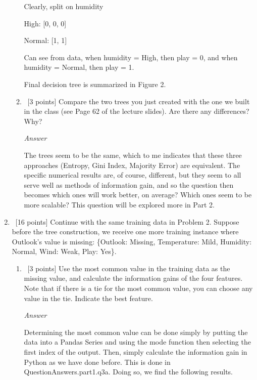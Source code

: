 \documentclass[12pt, fullpage,letterpaper]{article}
\begin{document}
\begin{enumerate}
\begin{enumerate}
    \vspace{5mm}
    
    Clearly, split on humidity
    
    \vspace{5mm}
    
    High: [0, 0, 0]
    
    Normal: [1, 1]

    \vspace{5mm}
    
    Can see from data, when humidity = High, then play = 0, and when humidity = Normal, then play = 1.
    
    \vspace{5mm}
    
    Final decision tree is summarized in Figure 2.
	
	\item~[3 points] Compare the two trees you just created with the one we built in the class (see Page 62 of the lecture slides). Are there any differences? Why?
	
	\emph{Answer}
	
	The trees seem to be the same, which to me indicates that these three approaches (Entropy, Gini Index, Majority Error) are equivalent. The specific numerical results are, of course, different, but they seem to all serve well as methods of information gain, and so the question then becomes which ones will work better, on average? Which ones seem to be more scalable? This question will be explored more in Part 2.
	
\end{enumerate}

\item~[16 points] Continue with the same training data in Problem 2. Suppose before the tree construction, we receive one more training instance where Outlook's value is missing: \{Outlook: Missing, Temperature: Mild, Humidity: Normal, Wind: Weak, Play: Yes\}. 

\begin{enumerate}
\item~[3 points] Use the most common value in the training data as the missing  value, and calculate the information gains of the four features. Note that if there is a tie for the most common value, you can choose any value in the tie.  Indicate the best feature. 

\emph{Answer}

Determining the most common value can be done simply by putting the data into a Pandas Series and using the mode function then selecting the first index of the output. Then, simply calculate the information gain in Python as we have done before. This is done in QuestionAnswers.part1.q3a. Doing so, we find the following results.


\end{enumerate}
\end{enumerate}
\end{document}
